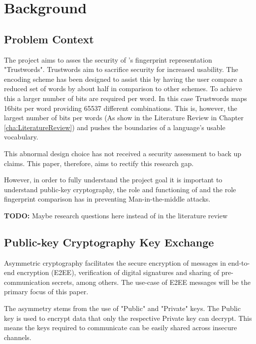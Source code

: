 \chapter{Background}
\label{cha:Background}

\section{Problem Context}
The project aims to asses the security of \pep's fingerprint representation "Trustwords". Trustwords aim to sacrifice security for increased usability. The encoding scheme has been designed to assist this by having  the user compare a reduced set of words by about half in comparison to other schemes. To achieve this a larger number of bits are required per word. In this case Trustwords maps 16bits per word providing 65537 different combinations. This is, however, the largest number of bits per words (As show in the Literature Review in Chapter \ref{cha:LiteratureReview}) and pushes the boundaries of a language's usable vocabulary.

This abnormal design choice has not received a security assessment to back up claims. This paper, therefore, aims to rectify this research gap.

However, in order to fully understand the project goal it is important to understand public-key cryptography, the role and functioning of \pep and the role fingerprint comparison has in preventing Man-in-the-middle attacks.

\textbf{TODO:} Maybe research questions here instead of in the literature review

\section{Public-key Cryptography Key Exchange}
Asymmetric cryptography facilitates the secure encryption of messages in end-to-end encryption (E2EE), verification of digital signatures and sharing of pre-communication secrets, among others. The use-case of E2EE messages will be the primary focus of this paper.

The asymmetry stems from the use of "Public" and "Private" keys. The Public key is used to encrypt data that only the respective Private key can decrypt. This means the keys required to communicate can be easily shared across insecure channels.

